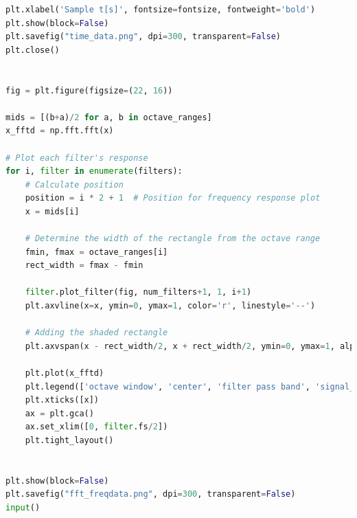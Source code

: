 \documentclass[a4paper, 11pt]{exam}
\begin{document}
\begin{lstlisting}[language=Python]
plt.xlabel('Sample t[s]', fontsize=fontsize, fontweight='bold')
plt.show(block=False)
plt.savefig("time_data.png", dpi=300, transparent=False)
plt.close()


fig = plt.figure(figsize=(22, 16))

mids = [(b+a)/2 for a, b in octave_ranges]
x_fftd = np.fft.fft(x)

# Plot each filter's response
for i, filter in enumerate(filters):
    # Calculate position
    position = i * 2 + 1  # Position for frequency response plot
    x = mids[i]

    # Determine the width of the rectangle from the octave range
    fmin, fmax = octave_ranges[i]
    rect_width = fmax - fmin

    filter.plot_filter(fig, num_filters+1, 1, i+1)
    plt.axvline(x=x, ymin=0, ymax=1, color='r', linestyle='--')
    
    # Adding the shaded rectangle
    plt.axvspan(x - rect_width/2, x + rect_width/2, ymin=0, ymax=1, alpha=0.3, color='blue')

    plt.plot(x_fftd)
    plt.legend(['octave window', 'center', 'filter pass band', 'signal_fft'], loc='upper right', bbox_to_anchor=(1, 1)) if i == 1 else None
    plt.xticks([x])
    ax = plt.gca()
    ax.set_xlim([0, filter.fs/2])
    plt.tight_layout()


plt.show(block=False)
plt.savefig("fft_freqdata.png", dpi=300, transparent=False)
input()
\end{lstlisting}
\end{document}
